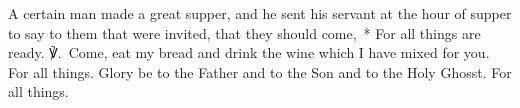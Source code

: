 \begin{enpars}\noindent A certain man made a great supper, and he sent his servant at the hour of supper to say to them that were invited, that they should come,~* For all things are ready.
℣.~Come, eat my bread and drink the wine which I have mixed for you. For all things. Glory be to the Father and to the Son and to the Holy Ghosst. For all things.
\end{enpars}